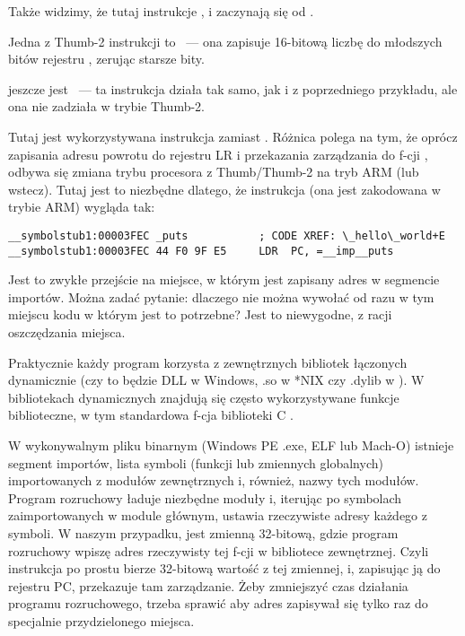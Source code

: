 Także widzimy, że tutaj instrukcje ,  i  zaczynają się od .

Jedna z Thumb-2 instrukcji to
~--- ona zapisuje 16-bitową liczbę do młodszych bitów rejestru , zerując starsze bity.

jeszcze jest ~--- ta instrukcja działa tak samo, jak i  z poprzedniego przykładu, ale ona nie zadziała w trybie Thumb-2.

Tutaj jest wykorzystywana instrukcja  zamiast .
Różnica polega na tym, że oprócz zapisania adresu powrotu do rejestru \ac{LR} i przekazania zarządzania 
do f-cji \puts, odbywa się zmiana trybu procesora z Thumb/Thumb-2 na tryb ARM (lub wstecz).
Tutaj jest to niezbędne dlatego, że instrukcja (ona jest zakodowana w trybie ARM) wygląda tak:

\begin{lstlisting}[style=customasmARM]
__symbolstub1:00003FEC _puts           ; CODE XREF: \_hello\_world+E
__symbolstub1:00003FEC 44 F0 9F E5     LDR  PC, =__imp__puts
\end{lstlisting}

Jest to zwykłe przejście na miejsce, w którym jest zapisany adres \puts w segmencie importów.
Można zadać pytanie: dlaczego nie można wywołać \puts od razu w tym miejscu kodu w którym jest to potrzebne?
Jest to niewygodne, z racji oszczędzania miejsca.

Praktycznie każdy program korzysta z zewnętrznych bibliotek łączonych dynamicznie (czy to będzie DLL w Windows, .so w *NIX 
czy .dylib w \MacOSX).
W bibliotekach dynamicznych znajdują się często wykorzystywane funkcje biblioteczne, w tym standardowa f-cja biblioteki C \puts.

W wykonywalnym pliku binarnym 
(Windows PE .exe, ELF lub Mach-O) istnieje segment importów, lista symboli (funkcji lub zmiennych globalnych) importowanych z modułów zewnętrznych i, również, nazwy tych modułów.
Program rozruchowy ładuje niezbędne moduły i, iterując po symbolach zaimportowanych w module głównym, ustawia rzeczywiste adresy każdego z symboli.
W naszym przypadku,  
jest zmienną 32-bitową, gdzie program rozruchowy wpiszę adres rzeczywisty tej f-cji w bibliotece zewnętrznej. 
Czyli instrukcja  po prostu bierze 32-bitową wartość z tej zmiennej, i, zapisując ją do rejestru \ac{PC}, przekazuje tam zarządzanie.
Żeby zmniejszyć czas działania programu rozruchowego, trzeba sprawić aby adres zapisywał się tylko raz do specjalnie przydzielonego miejsca.

